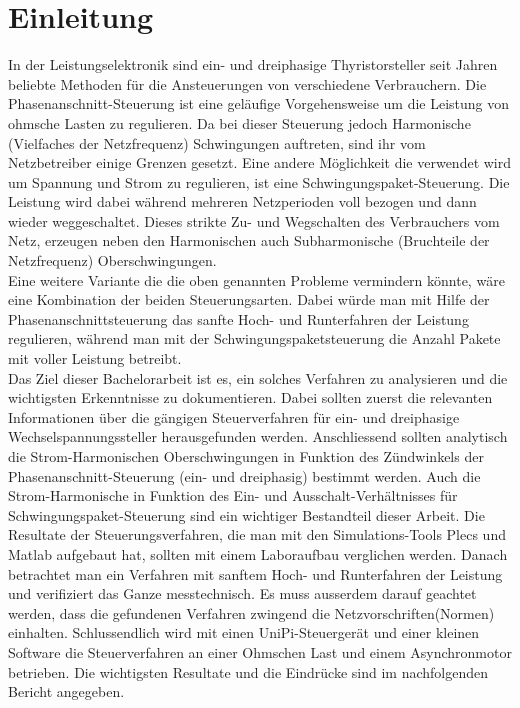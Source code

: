 \section{Einleitung}











In der Leistungselektronik sind ein- und dreiphasige Thyristorsteller seit Jahren beliebte Methoden für die Ansteuerungen von verschiedene Verbrauchern. Die Phasenanschnitt-Steuerung ist eine geläufige Vorgehensweise um die Leistung von ohmsche Lasten zu regulieren. Da bei dieser Steuerung jedoch Harmonische (Vielfaches der Netzfrequenz) Schwingungen auftreten, sind ihr vom Netzbetreiber einige Grenzen gesetzt. Eine andere Möglichkeit die verwendet wird um Spannung und Strom zu regulieren, ist eine Schwingungspaket-Steuerung. Die Leistung wird dabei während mehreren Netzperioden voll bezogen und dann wieder weggeschaltet. Dieses strikte Zu- und Wegschalten des Verbrauchers vom Netz, erzeugen neben den Harmonischen auch Subharmonische (Bruchteile der Netzfrequenz) Oberschwingungen.\\
Eine weitere Variante die die oben genannten Probleme vermindern könnte, wäre eine Kombination der beiden Steuerungsarten. Dabei würde man mit Hilfe der Phasenanschnittsteuerung das sanfte Hoch- und Runterfahren der Leistung regulieren, während man mit der Schwingungspaketsteuerung die Anzahl Pakete mit voller Leistung betreibt.\\
Das Ziel dieser Bachelorarbeit ist es, ein solches Verfahren zu analysieren und die wichtigsten Erkenntnisse zu dokumentieren. Dabei sollten zuerst die relevanten Informationen über die gängigen Steuerverfahren für ein- und dreiphasige Wechselspannungssteller herausgefunden werden. Anschliessend sollten analytisch die Strom-Harmonischen Oberschwingungen in Funktion des Zündwinkels der Phasenanschnitt-Steuerung (ein- und dreiphasig) bestimmt werden. Auch die Strom-Harmonische in Funktion des Ein- und Ausschalt-Verhältnisses für Schwingungspaket-Steuerung sind ein wichtiger Bestandteil dieser Arbeit. Die Resultate der Steuerungsverfahren, die man mit den Simulations-Tools Plecs und Matlab aufgebaut hat, sollten mit einem Laboraufbau verglichen werden. Danach betrachtet man ein Verfahren mit sanftem Hoch- und Runterfahren der Leistung und verifiziert das Ganze messtechnisch. Es muss ausserdem darauf geachtet werden, dass die gefundenen Verfahren zwingend die Netzvorschriften(Normen) einhalten. Schlussendlich wird mit einen UniPi-Steuergerät und einer kleinen Software die Steuerverfahren an einer Ohmschen Last und einem Asynchronmotor betrieben. Die wichtigsten Resultate und die Eindrücke sind im nachfolgenden Bericht angegeben.\\
